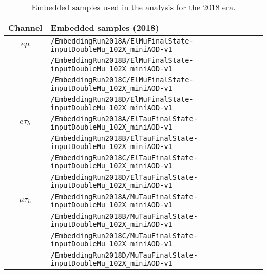     \begin{table}[ht]
    \begin{center}
    {\scriptsize
    \begin{tabular}{|c|l|}
    \hline
    Channel & Embedded samples (2018)\\
    \hline
    $e\mu$ & \texttt{/EmbeddingRun2018A/ElMuFinalState-inputDoubleMu\_102X\_miniAOD-v1}\\
    & \texttt{/EmbeddingRun2018B/ElMuFinalState-inputDoubleMu\_102X\_miniAOD-v1}\\
    & \texttt{/EmbeddingRun2018C/ElMuFinalState-inputDoubleMu\_102X\_miniAOD-v1}\\
    & \texttt{/EmbeddingRun2018D/ElMuFinalState-inputDoubleMu\_102X\_miniAOD-v1}\\
    \hline
    $e\tau_{h}$ & \texttt{/EmbeddingRun2018A/ElTauFinalState-inputDoubleMu\_102X\_miniAOD-v1}\\
    & \texttt{/EmbeddingRun2018B/ElTauFinalState-inputDoubleMu\_102X\_miniAOD-v1}\\
    & \texttt{/EmbeddingRun2018C/ElTauFinalState-inputDoubleMu\_102X\_miniAOD-v1}\\
    & \texttt{/EmbeddingRun2018D/ElTauFinalState-inputDoubleMu\_102X\_miniAOD-v1}\\
    \hline
    $\mu\tau_{h}$ & \texttt{/EmbeddingRun2018A/MuTauFinalState-inputDoubleMu\_102X\_miniAOD-v1}\\
    & \texttt{/EmbeddingRun2018B/MuTauFinalState-inputDoubleMu\_102X\_miniAOD-v1}\\
    & \texttt{/EmbeddingRun2018C/MuTauFinalState-inputDoubleMu\_102X\_miniAOD-v1}\\
    & \texttt{/EmbeddingRun2018D/MuTauFinalState-inputDoubleMu\_102X\_miniAOD-v1}\\
    \hline
    \end{tabular}
    }
    \end{center}
    \caption{Embedded samples used in the analysis for the 2018 era.}
    \label{tab:2018emb}
\end{table}
    
